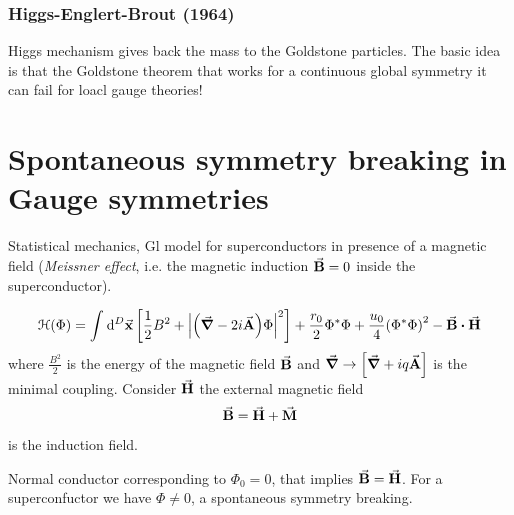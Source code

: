 \documentclass[../main/main.tex]{subfiles}
\begin{document}
\subsubsection{Higgs-Englert-Brout (1964)}
Higgs mechanism gives back the mass to the Goldstone particles.
The basic idea is that the Goldstone theorem that works for a continuous global symmetry it can fail for loacl gauge theories!

\section{Spontaneous symmetry breaking in Gauge symmetries}
Statistical mechanics, Gl model for superconductors in presence of a magnetic field (\emph{Meissner effect}, i.e. the magnetic induction \( \va{B} = 0 \) inside the superconductor).

\begin{equation}
  \mathcal{H} (\Phi ) = \int_{}^{} \dd[D]{\va{x}} \qty[\frac{1}{2}B^2 + \abs{\qty(\va{\grad }- 2 i \va{A})\Phi  }^2 ] + \frac{r_0}{2} \Phi ^* \Phi
  + \frac{u_0}{4} \qty(\Phi ^* \Phi )^2 - \va{B} \vdot \va{H}
\end{equation}
where \( \frac{B^2}{2} \) is the energy of the magnetic field \( \va{B} \) and \( \va{\grad } \rightarrow \qty[\va{\grad } + i q \va{A}]  \) is the minimal coupling.
Consider \( \va{H} \) the external magnetic field
\begin{equation}
  \va{B} = \va{H} + \va{M}
\end{equation}
is the induction field.

Normal conductor corresponding to \( \Phi _0 = 0 \), that implies \( \va{B} = \va{H} \). For a superconfuctor we have \( \Phi \neq 0 \), a spontaneous symmetry breaking.   
\end{document}
